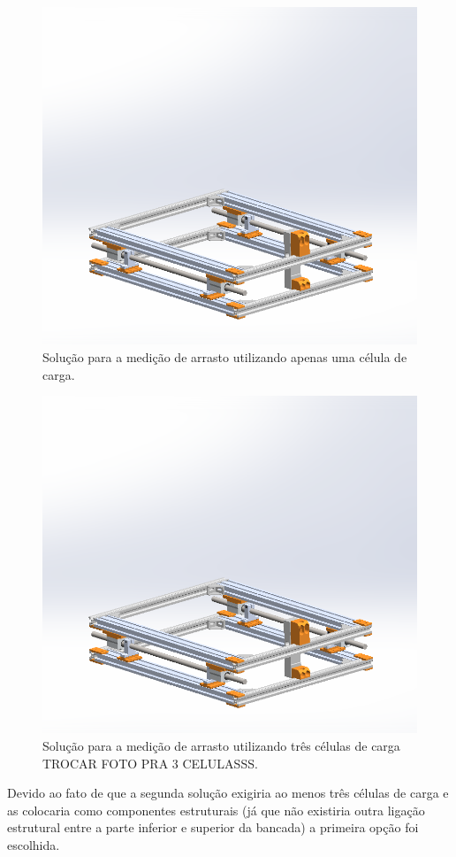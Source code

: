 \begin{figure}[!ht]
    \centering
    \includegraphics[width=.8\linewidth]{figuras/renders/bandeja_inferior.png}
    \caption{Solução para a medição de arrasto utilizando apenas uma célula de carga\cite{autor}.}
    \label{fig:bandeja_inferior_1}
\end{figure}

\begin{figure}[!ht]
    \centering
    \includegraphics[width=.8\linewidth]{figuras/renders/bandeja_inferior.png}
    \caption{Solução para a medição de arrasto utilizando três células de carga TROCAR FOTO PRA 3 CELULASSS\cite{autor}.}
    \label{fig:bandeja_inferior_2}
\end{figure}

Devido ao fato de que a segunda solução exigiria ao menos três células de carga e as colocaria como componentes estruturais (já que não existiria outra ligação estrutural entre a parte inferior e superior da bancada) a primeira opção foi escolhida.

